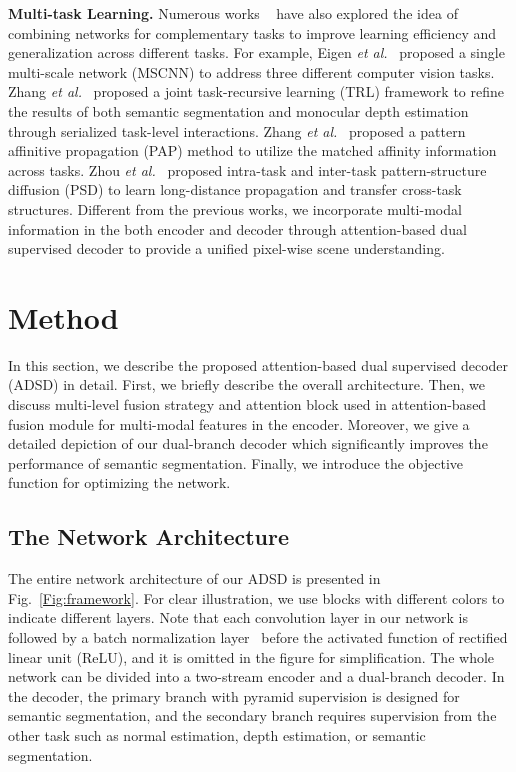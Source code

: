 \documentclass[10pt,twocolumn,letterpaper]{article}
\begin{document}
\textbf{Multi-task Learning.}
Numerous works ~\cite{Eigen:ICCV15,Kong:CVPR18,Xu:CVPR18,Zhang:ECCV18,Nekrasov:ICRA19,Zhang:CVPR19,Zhou:CVPR20,Vandenhende:ECCV20} have also explored the idea of combining networks for complementary tasks to improve learning efficiency and generalization across different tasks. For example, Eigen \textit{et al.}~\cite{Eigen:ICCV15} proposed a single multi-scale network (MSCNN) to address three different computer vision tasks. Zhang \textit{et al.}~\cite{Zhang:ECCV18} proposed a joint task-recursive learning (TRL) framework to refine the results of both semantic segmentation and monocular depth estimation through serialized task-level interactions. Zhang \textit{et al.}~\cite{Zhang:CVPR19} proposed a pattern affinitive propagation (PAP) method to utilize the matched affinity information across tasks.  Zhou \textit{et al.}~\cite{Zhou:CVPR20} proposed intra-task and inter-task pattern-structure diffusion (PSD) to learn long-distance propagation and transfer cross-task structures. Different from the previous works, we incorporate multi-modal information in the both encoder and decoder through attention-based dual supervised decoder to provide a unified pixel-wise scene understanding.

\section{Method}
In this section, we describe the proposed attention-based dual supervised decoder (ADSD) in detail. First, we briefly describe the overall architecture. Then, we discuss multi-level fusion strategy and attention block used in attention-based fusion module for multi-modal features in the encoder. Moreover, we give a detailed depiction of our dual-branch decoder which significantly improves the performance of semantic segmentation. Finally, we introduce the objective function for optimizing the network.

\subsection{The Network Architecture}\label{sec:Method}
The entire network architecture of our ADSD is presented in Fig.~\ref{Fig:framework}. For clear illustration, we use blocks with different colors to indicate different layers. Note that each convolution layer in our network is followed by a batch normalization layer~\cite{Ioffe:ICML2015} before the activated function of rectified linear unit (ReLU), and it is omitted in the figure for simplification. The whole network can be divided into a two-stream encoder and a dual-branch decoder. In the decoder, the primary branch with pyramid supervision is designed for semantic segmentation, and the secondary branch requires supervision from the other task such as normal estimation, depth estimation, or semantic segmentation.
\end{document}
